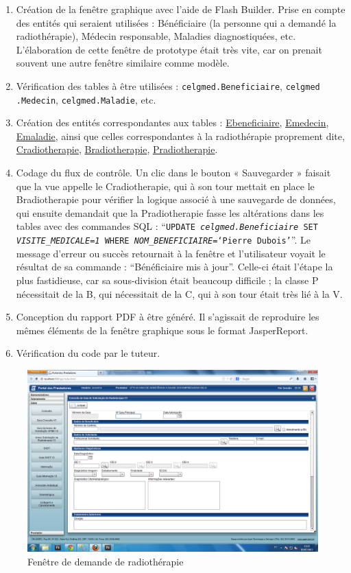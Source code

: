 \begin{enumerate}
\item Création de la fenêtre graphique avec l'aide de Flash Builder. Prise en compte des entités qui seraient utilisées : Bénéficiaire (la personne qui a demandé la radiothérapie), Médecin responsable, Maladies diagnostiquées, etc. L'élaboration de cette fenêtre de prototype était très vite, car on prenait souvent une autre fenêtre similaire comme modèle.
\item Vérification des tables à être utilisées : \texttt{celgmed.Beneficiaire}, \texttt{celgmed} \texttt{.Medecin}, \texttt{celgmed.Maladie}, etc.
\item Création des entités correspondantes aux tables : \underline{Ebeneficiaire}, \underline{Emedecin}, \underline{Emaladie}, ainsi que celles correspondantes à la radiothérapie proprement dite, \underline{Cradiotherapie}, \underline{Bradiotherapie}, \underline{Pradiotherapie}. 
\item Codage du flux de contrôle. Un clic dans le bouton « Sauvegarder » faisait que la vue appelle le Cradiotherapie, qui à son tour mettait en place le Bradiotherapie pour vérifier la logique associé à une sauvegarde de données, qui ensuite demandait que la Pradiotherapie fasse les altérations dans les tables avec des commandes SQL : ``\texttt{UPDATE \textit{celgmed.Beneficiaire} SET \textit{VISITE\_MEDICALE}=\textit{1} WHERE \textit{NOM\_BENEFICIAIRE}=`\textit{Pierre \\ Dubois}'}''. Le message d'erreur ou succès retournait à la fenêtre et l'utilisateur voyait le résultat de sa commande : ``Bénéficiaire mis à jour''. Celle-ci était l'étape la plus fastidieuse, car sa sous-division était beaucoup difficile ; la classe P nécessitait de la B, qui nécessitait de la C, qui à son tour était très lié à la V.
\item Conception du rapport PDF à être généré. Il s'agissait de reproduire les mêmes éléments de la fenêtre graphique sous le format JasperReport.
\item Vérification du code par le tuteur.
\end{enumerate}

\begin{figure}[h]
\begin{center}
    \includegraphics[scale=0.39]{img/pp-radio}
    \caption{Fenêtre de demande de radiothérapie}
	\label{pp-radio}
\end{center}
\end{figure}


